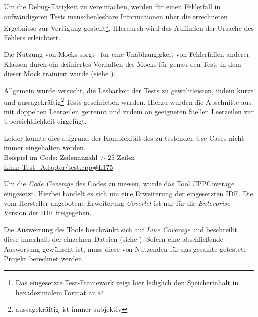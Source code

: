 Um die Debug-Tätigkeit zu vereinfachen, werden für einen Fehlerfall in aufwändigeren Tests menschenlesbare Informationen über die errechneten Ergebnisse zur Verfügung gestellt\footnote{Das eingesetzte Test-Framework zeigt hier lediglich den Speicherinhalt in hexadezimalem Format an.}. HIerdurch wird das Auffinden der Ursache des Fehlers erleichtert.

Die Nutzung von Mocks sorgt \ua\ für eine Unabhängigkeit von Fehlerfällen anderer Klassen durch ein definiertes Verhalten des Mocks für genau den Test, in dem dieser Mock trainiert wurde (siehe ).


Allgemein wurde versucht, die Lesbarkeit der Tests zu gewährleisten, indem kurze und aussagekräftig\footnote{\glq aussagekräftig\grq\ ist immer subjektiv} Tests geschrieben wurden.
Hierzu wurden die Abschnitte aus  mit doppelten Leerzeilen getrennt und zudem an geeigneten Stellen Leerzeilen zur Übersichtlichkeit eingefügt.

Leider konnte dies aufgrund der Komplexität des zu testenden Use Cases nicht immer eingehalten werden.\\
Beispiel im Code: Zeilenanzahl > 25 Zeilen\\ \href{https://github.com/MobMonRob/ROSLabDrohne/blob/9edc7b5814c1bb731abf0f7af4352289e57b681f/Code/Test\_Adapter/test.cpp\#L175}{Link: Test\_Adapter/test.cpp\#L175}






Um die \textit{Code Coverage} des Codes zu messen, wurde das Tool \href{https://github.com/atlaste/CPPCoverage}{CPPCoverage} eingesetzt. Hierbei handelt es sich um eine Erweiterung der eingesetzten IDE. Die vom Hersteller angebotene Erweiterung \textit{Coverlet} ist nur für die \textit{Enterprise}-Version der IDE freigegeben.

Die Auswertung des Tools beschränkt sich auf \textit{Line Coverage} und beschreibt diese innerhalb der einzelnen Dateien (siehe ). Sofern eine abschließende Auswertung gewünscht ist, muss diese von Nutzenden für das gesamte getestete Projekt berechnet werden.

